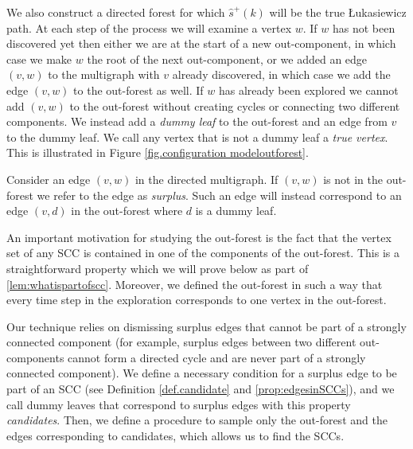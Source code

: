 We also construct a directed forest for which $\hat{s}^+(k)$ will be the true \L{}ukasiewicz path. At each step of the process we will examine a vertex $w$. If $w$ has not been discovered yet then either we are at the start of a new out-component, in which case we make $w$ the root of the next out-component, or we added an edge $(v, w)$ to the multigraph with $v$ already discovered, in which case we add the edge $(v, w)$ to the out-forest as well. If $w$ has already been explored we cannot add $(v, w)$ to the out-forest without creating cycles or connecting two different components. We instead add a \emph{dummy leaf} to the out-forest and an edge from $v$ to the dummy leaf.  We call any vertex that is not a dummy leaf a  \emph{true vertex}. This is illustrated in Figure \ref{fig.configuration modeloutforest}.


Consider an edge $(v,w)$ in the directed multigraph. If $(v, w)$ is not in the out-forest we refer to the edge as \emph{surplus}. Such an edge will instead correspond to an edge $(v, d)$ in the out-forest where $d$ is a dummy leaf. 

An important motivation for studying the out-forest is the fact that the vertex set of any SCC is contained in one of the components of the out-forest. This is a straightforward property which we will prove below as part of \cref{lem:whatispartofscc}. Moreover, we defined the out-forest in such a way that every time step in the exploration corresponds to one vertex in the out-forest.

Our technique relies on dismissing surplus edges that cannot be part of a strongly connected component (for example, surplus edges between two different out-components cannot form a directed cycle and are never part of a strongly connected component). We define a necessary condition for a surplus edge to be part of an SCC (see Definition \ref{def.candidate} and \cref{prop:edgesinSCCs}), and we call dummy leaves that correspond to surplus edges with this property \emph{candidates}. Then, we define a procedure to sample only the out-forest and the edges corresponding to candidates, which allows us to find the SCCs.

